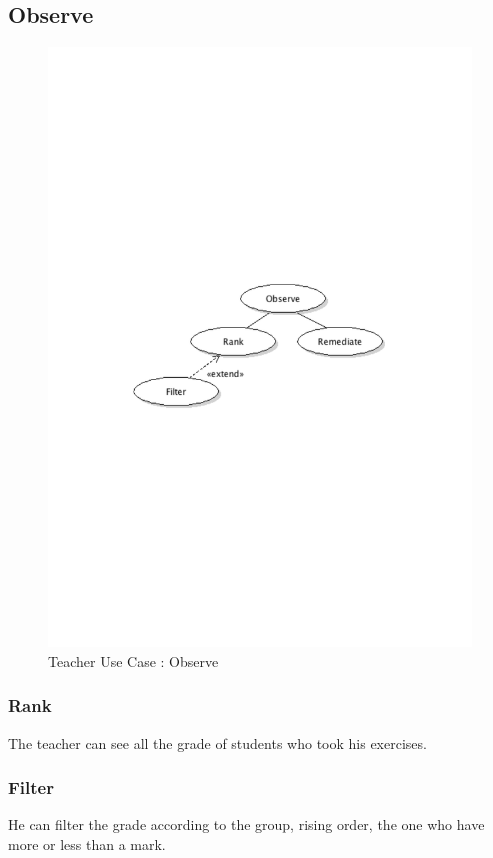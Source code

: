 	\subsection{Observe}
		\begin{figure}[ht]
			\begin{center}
				\includegraphics[width=\textwidth,  trim=2cm 10cm 2cm 11cm]{UML_figure/UC/teacher/UC_Teacher_Observe.pdf}
				\caption{Teacher Use Case : Observe}
			\end{center}
		\end{figure}
		\subsubsection{Rank}
			The teacher can see all the grade of students who took his exercises.
		\subsubsection{Filter}
			He can filter the grade according to the group, rising order, the one who have more or less than a mark.
